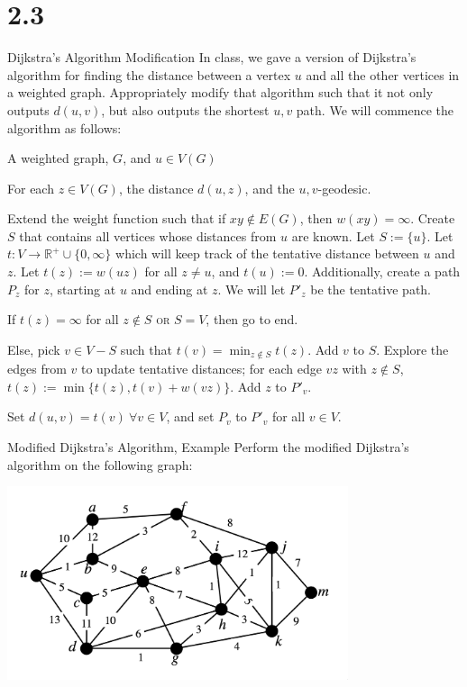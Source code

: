 \documentclass[8pt]{extarticle}
\title{}
\author{Avinash Iyer}
\date{}
\begin{document}
{
\section*{2.3}%
  \begin{problem}{Dijkstra's Algorithm Modification}
    In class, we gave a version of Dijkstra's algorithm for finding the distance between a vertex $u$ and all the other vertices in a weighted graph. Appropriately modify that algorithm such that it not only outputs $d(u,v)$, but also outputs the shortest $u,v$ path.
    \tcblower
    We will commence the algorithm as follows:
    \begin{description}[font=\normalfont\scshape]
      \item[Input] A weighted graph, $G$, and $u\in V(G)$
      \item[Output] For each $z\in V(G)$, the distance $d(u,z)$, and the $u,v$-geodesic.
      \item[Initialization]Extend the weight function such that if $xy\notin E(G)$, then $w(xy) = \infty$. Create $S$ that contains all vertices whose distances from $u$ are known. Let $S := \{u\}$. Let $t:V\rightarrow \mathbb{R}^+ \cup \{0,\infty\}$ which will keep track of the tentative distance between $u$ and $z$. Let $t(z) := w(uz)$ for all $z\neq u$, and $t(u) := 0$. Additionally, create a path $P_{z}$ for $z$, starting at $u$ and ending at $z$. We will let $P'_{z}$ be the tentative path.
      \item[Condition to Terminate Loop] If $t(z) = \infty$ for all $z\notin S$ \textsc{or} $S = V$, then go to end.
      \item[Loop] Else, pick $v\in V-S$ such that $t(v) = \min_{z\notin S} t(z)$. Add $v$ to $S$. Explore the edges from $v$ to update tentative distances; for each edge $vz$ with $z\notin S$, $t(z) := \min\{t(z),t(v) + w(vz)\}$. Add $z$ to $P'_v$.
      \item[End] Set $d(u,v) = t(v)~\forall v\in V$, and set $P_v$ to $P'_v$ for all $v\in V$.
    \end{description}
  \end{problem}
  \begin{problem}{Modified Dijkstra's Algorithm, Example}
    Perform the modified Dijkstra's algorithm on the following graph:
    \begin{center}
      \includegraphics[width=10cm]{2_3_graph}

\end{center}
\end{problem}}
\end{document}
